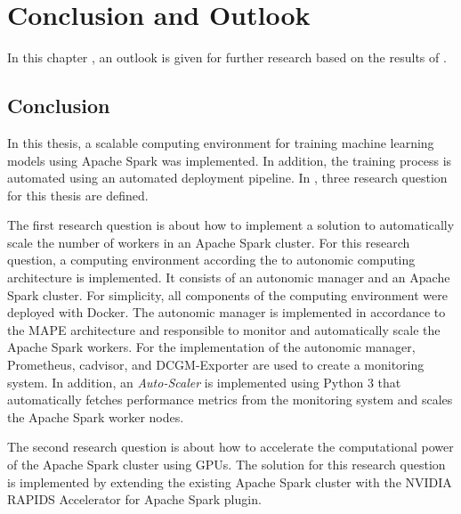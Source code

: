 \chapter{Conclusion and Outlook}
\label{chap:08_outlook}

In this chapter , an outlook is given for further research based on the results of .


\section{Conclusion}
In this thesis, a scalable computing environment for training machine learning models using Apache Spark was implemented. In addition, the training process is automated using an automated deployment pipeline.
In , three research question for this thesis are defined.


The first research question is about how to implement a solution to automatically scale the number of workers in an Apache Spark cluster.
For this research question, a computing environment according the to autonomic computing architecture is implemented.
It consists of an autonomic manager and an Apache Spark cluster.
For simplicity, all components of the computing environment were deployed with Docker.
The autonomic manager is implemented in accordance to the MAPE architecture and responsible to monitor and automatically scale the Apache Spark workers.
For the implementation of the autonomic manager, Prometheus, cadvisor, and DCGM-Exporter are used to create a monitoring system.
In addition, an \textit{Auto-Scaler} is implemented using Python 3 that automatically fetches performance metrics from the monitoring system and scales the Apache Spark worker nodes.


The second research question is about how to accelerate the computational power of the Apache Spark cluster using GPUs.
The solution for this research question is implemented by extending the existing Apache Spark cluster with the NVIDIA RAPIDS Accelerator for Apache Spark plugin.
%


